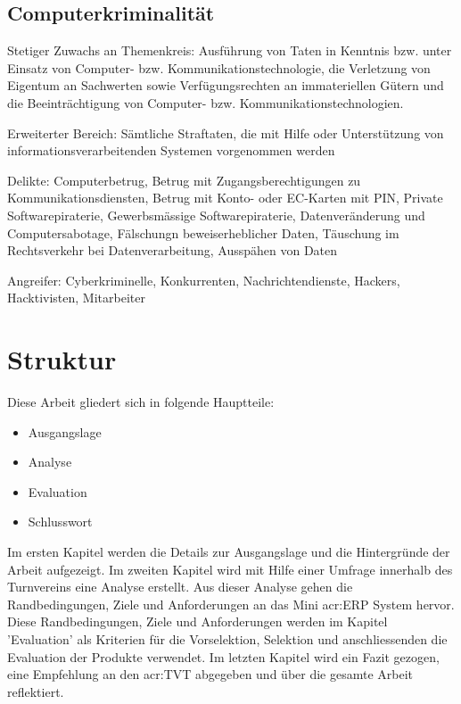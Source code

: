 \subsection{Computerkriminalität}
Stetiger Zuwachs an
Themenkreis: Ausführung von Taten in Kenntnis bzw. unter Einsatz von Computer- bzw. Kommunikationstechnologie, die Verletzung von Eigentum an Sachwerten sowie Verfügungsrechten an immateriellen Gütern und die Beeinträchtigung von Computer- bzw. Kommunikationstechnologien.

Erweiterter Bereich: Sämtliche Straftaten, die mit Hilfe oder Unterstützung von informationsverarbeitenden Systemen vorgenommen werden

Delikte: Computerbetrug, Betrug mit Zugangsberechtigungen zu Kommunikationsdiensten, Betrug mit Konto- oder EC-Karten mit PIN, Private Softwarepiraterie, Gewerbsmässige Softwarepiraterie, Datenveränderung und Computersabotage, Fälschungn beweiserheblicher Daten, Täuschung im Rechtsverkehr bei Datenverarbeitung, Ausspähen von Daten

Angreifer: Cyberkriminelle, Konkurrenten, Nachrichtendienste, Hackers, Hacktivisten, Mitarbeiter

\section{Struktur}
Diese Arbeit gliedert sich in folgende Hauptteile:
\begin{itemize}
\item Ausgangslage
\item Analyse
\item Evaluation
\item Schlusswort
\end{itemize}

Im ersten Kapitel werden die Details zur Ausgangslage und die Hintergründe der Arbeit aufgezeigt. Im zweiten Kapitel wird mit Hilfe einer Umfrage innerhalb des Turnvereins eine Analyse erstellt. Aus dieser Analyse gehen die Randbedingungen, Ziele und Anforderungen an das Mini \gls{acr:ERP} System hervor. Diese Randbedingungen, Ziele und Anforderungen werden im Kapitel 'Evaluation' als Kriterien für die Vorselektion, Selektion und anschliessenden die Evaluation der Produkte verwendet. Im letzten Kapitel wird ein Fazit gezogen, eine Empfehlung an den \gls{acr:TVT} abgegeben und über die gesamte Arbeit reflektiert.

